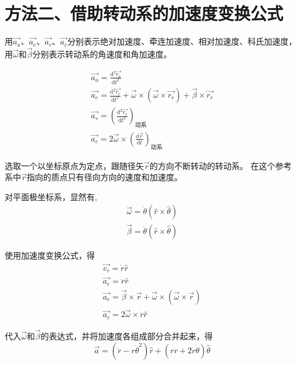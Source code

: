 \documentclass{ctexart}
\begin{document}
    \section[方法二、借助转动系的加速度变换公式]{方法二、借助转动系的加速度变换公式\protect\footnotemark}\label{sec:3}

    用$\vec{a_a}$、$\vec{a_e}$、$\vec{a_r}$、$\vec{a_c}$分别表示绝对加速度、牵连加速度、相对加速度、科氏加速度，
    用$\vec{\omega}$和$\vec{\beta}$分别表示转动系的角速度和角加速度。

    \begin{gather*}
        \vec{a_a} = \frac{\mathrm{d}^2\vec{r_a}}{\mathrm{d}t^2} \\
        \vec{a_e} = \frac{\mathrm{d}^2\vec{r_e}}{\mathrm{d}t^2}+
        \vec{\omega}\times(\vec{\omega}\times\vec{r_r})+
        \vec{\beta}\times\vec{r_r} \\
        \vec{a_r} = (\frac{\mathrm{d}^2\vec{r_r}}{\mathrm{d}t^2})_{\text{动系}} \\
        \vec{a_c} = 2\vec{\omega}\times(\frac{\mathrm{d}\vec{r}}{\mathrm{d}t})_{\text{动系}}
    \end{gather*}

    选取一个以坐标原点为定点，跟随径矢$\vec{r}$的方向不断转动的转动系。
    在这个参考系中$\vec{r}$指向的质点只有径向方向的速度和加速度。

    对平面极坐标系，显然有,
    \begin{gather*}
        \vec{\omega} = \dot{\theta}(\hat{r}\times\hat{\theta}) \\
        \vec{\beta} = \ddot{\theta}(\hat{r}\times\hat{\theta})
    \end{gather*}

    使用加速度变换公式，得
    \begin{gather}
        \vec{v_r} = \dot{r}\hat{r} \label{eq:1} \\
        \vec{a_r} = \ddot{r}\hat{r} \label{eq:2} \\
        \vec{a_e} = \vec{\beta}\times\vec{r}+\vec{\omega}\times(\vec{\omega}\times\vec{r})
        \label{eq:3} \\
        \vec{a_c} = 2\vec{\omega}\times\dot{r}\hat{r} \label{eq:4}
    \end{gather}

    代入$\vec{\omega}$和$\vec{\beta}$的表达式，并将加速度各组成部分合并起来，得
    \begin{equation*}
        \vec{a} = (\ddot{r}-r\dot{\theta}^2)\hat{r}+(r\ddot{r}+2\dot{r}\dot{\theta})\hat{\theta}
    \end{equation*}
\end{document}
